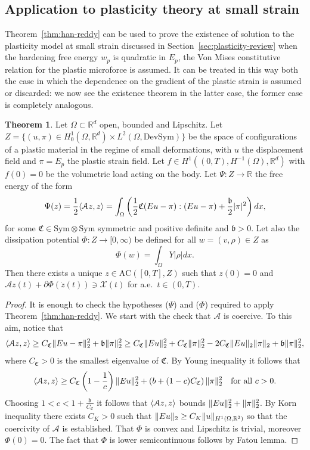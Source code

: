 \documentclass[a4paper,10pt,oneside]{amsbook}
\numberwithin{section}{chapter}
\numberwithin{equation}{chapter}
\theoremstyle{definition}
\newtheorem{thm}[prop]{Theorem}
\DeclarePairedDelimiter{\norm}{\lVert}{\rVert}
\DeclarePairedDelimiter{\dual}{\langle}{\rangle}
\begin{document}
\subsection{Application to plasticity theory at small strain}

Theorem~\ref{thm:han-reddy} can be used to prove the existence of solution to the plasticity model at small strain discussed in Section~\ref{sec:plasticity-review} when the hardening free energy $w_p$ is quadratic in $E_p$, the Von Mises constitutive relation for the plastic microforce is assumed. It can be treated in this way both the case in which the dependence on the gradient of the plastic strain is assumed or discarded: we now see the existence theorem in the latter case, the former case is completely analogous.
\begin{thm}
Let $\Omega\subset\mathbb{R}^d$ open, bounded and Lipschitz. Let $Z=\{(u,\pi)\in H^1_0(\Omega,\mathbb{R}^d)\times L^2(\Omega,\text{DevSym})\}$ be the space of configurations of a plastic material in the regime of small deformations, with $u$ the displacement field and $\pi=E_p$ the plastic strain field. Let $f\in H^1((0,T),H^{-1}(\Omega),\mathbb{R}^d)$ with $f(0)=0$ be the volumetric load acting on the body. Let $\Psi\colon Z\to\mathbb{R}$ the free energy of the form
\[
\Psi(z)=\frac{1}{2}\dual{\mathcal{A}z,z}=\int_\Omega\left(\frac{1}{2}\mathfrak{C}(Eu-\pi):(Eu-\pi)+\frac{\mathfrak{b}}{2}|\pi|^2\right)dx,
\]
for some $\mathfrak{C}\in\text{Sym}\otimes\text{Sym}$ symmetric and positive definite and $\mathfrak{b}>0$. Let also the dissipation potential $\Phi\colon Z\to[0,\infty)$ be defined for all $w=(v,\rho)\in Z$ as
\[
\Phi(w)=\int_\Omega Y|\rho|dx.
\]
Then there exists a unique $z\in\text{AC}([0,T],Z)$ such that $z(0)=0$ and $\mathcal{A}z(t)+\partial\Phi(\dot z(t))\ni\mathcal{X}(t)$ for a.e.\ $t\in(0,T)$.
\end{thm}
\begin{proof}
It is enough to check the hypotheses ($\Psi$)  and ($\Phi$) required to apply Theorem~\ref{thm:han-reddy}. We start with the check that $\mathcal{A}$ is coercive. To this aim, notice that
\[
\dual{\mathcal{A}z,z}\ge C_\mathfrak{C}\norm{Eu-\pi}_2^2+\mathfrak{b}\norm{\pi}_2^2\ge C_\mathfrak{C}\norm{Eu}_2^2+C_\mathfrak{C}\norm{\pi}_2^2-2C_\mathfrak{C}\norm{Eu}_2\norm{\pi}_2+\mathfrak{b}\norm{\pi}_2^2,
\]
where $C_\mathfrak{C}>0$ is the smallest eigenvalue of $\mathfrak{C}$. By Young inequality it follows that
\[
\dual{\mathcal{A}z,z}\ge C_\mathfrak{C}\left(1-\frac{1}{c}\right)\norm{Eu}_2^2+\left(b+(1-c)C_\mathfrak{C}\right)\norm{\pi}_2^2\quad\text{for all $c>0$}.
\]
Choosing $1<c<1+\frac{\mathfrak{b}}{C_\mathfrak{C}}$ it follows that $\dual{\mathcal{A}z,z}$ bounds $\norm{Eu}_2^2+\norm{\pi}_2^2$. By Korn inequality there exists $C_K>0$ such that $\norm{Eu}_2\ge C_K\norm{u}_{H^1(\Omega,\mathbb{R}^2)}$ so that the coercivity of $\mathcal{A}$ is established. That $\Phi$ is convex and Lipschitz is trivial, moreover $\Phi(0)=0$. The fact that $\Phi$ is lower semicontinuous follows by Fatou lemma.
\end{proof}
\end{document}
